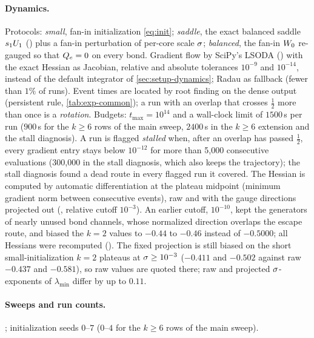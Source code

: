 \paragraph{Dynamics.}
Protocols: \emph{small}, fan-in initialization \eqref{eq:init}; \emph{saddle}, the exact balanced saddle $s_{1}U_{1}$
() plus a fan-in perturbation of per-core scale $\sigma$;
\emph{balanced}, the fan-in $W_{0}$ re-gauged so that $Q_{e}=0$ on every bond. Gradient flow by SciPy's
LSODA () with the exact Hessian as Jacobian, relative and absolute tolerances $10^{-9}$
and $10^{-14}$, instead of the default integrator of \cref{sec:setup-dynamics}; Radau as fallback
(fewer than $1\%$ of runs). Event times are located by root finding on the dense output (persistent rule,
\cref{tab:exp-common}); a run with an overlap that crosses $\frac12$ more than once is a \emph{rotation}.
Budgets: $t_{\max}=10^{14}$ and a wall-clock limit of $1500$\,s per run ($900$\,s for the $k\ge6$ rows of the
main sweep, $2400$\,s in the $k\ge6$ extension and the stall diagnosis). A run is flagged \emph{stalled} when,
after an overlap has passed $\frac12$, every gradient entry stays below $10^{-12}$ for more than 5,000
consecutive evaluations (300,000 in the stall diagnosis, which also keeps the trajectory); the stall
diagnosis found a dead route in every flagged run it covered. The Hessian is computed by automatic differentiation at the plateau
midpoint (minimum gradient norm between consecutive events), raw and with the gauge directions
projected out (, relative cutoff $10^{-3}$). An earlier cutoff,
$10^{-10}$, kept the generators of nearly unused bond channels, whose normalized direction overlaps the
escape route, and biased the $k=2$ values to $-0.44$ to $-0.46$ instead of $-0.5000$; all Hessians were
recomputed (). The fixed projection is still biased on the short
small-initialization $k=2$ plateaus at $\sigma\ge10^{-3}$ ($-0.411$ and $-0.502$ against raw $-0.437$ and
$-0.581$), so raw values are quoted there; raw and projected $\sigma$-exponents of $\lambda_{\min}$ differ by
up to $0.11$.

\paragraph{Sweeps and run counts.} ; initialization seeds $0$--$7$ ($0$--$4$ for the
$k\ge6$ rows of the main sweep).

